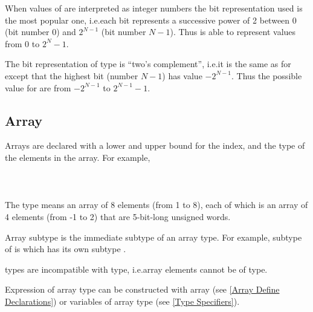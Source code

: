 When values of \UWord[N] are interpreted as integer numbers the bit
representation used is the most popular one, i.e.\@ each bit represents
a successive power of 2 between $0$ (bit number 0) and $2^{N-1}$ (bit
number $N-1$). Thus \UWord[N] is able to represent values from 0 to
$2^{N}-1$.

The bit representation of \SWord[N] type is ``two's complement'',
i.e.\@ it is the same as for \UWord[N] except that the highest bit
(number $N-1$) has value $-2^{N-1}$. Thus the possible value for
\SWord[N] are from $-2^{N-1}$ to $2^{N-1}-1$.


\subsection{Array}
\label{Array Type}

Arrays are declared with a lower and upper bound for the index, and
the type of the elements in the array. For example,\\

\indent{}\\
\indent{}\\
\indent{}\\

The type  means an
array of 8 elements (from 1 to 8), each of which is an array of 4
elements (from -1 to 2) that are 5-bit-long unsigned words.

Array subtype is the immediate subtype of an array type. For example,
subtype of 
is  which has its own subtype
\UWord[5].

\Array types are incompatible with \Set type, i.e.\@ array elements cannot
be of \Set type.

Expression of array type can be constructed with array
 (see \ref{Array Define Declarations}) or variables of
array type (see \ref{Type Specifiers}).


